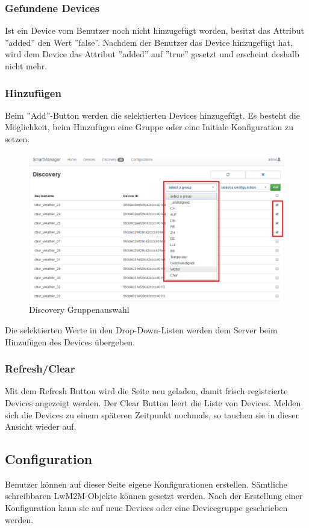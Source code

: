 \subsubsection{Gefundene Devices}
Ist ein Device vom Benutzer noch nicht hinzugefügt worden, besitzt das Attribut ''added'' den Wert ''false''. Nachdem der Benutzer das Device hinzugefügt hat, wird dem Device das Attribut ''added'' auf ''true'' gesetzt und erscheint deshalb nicht mehr.

\subsubsection{Hinzufügen}
Beim ''Add''-Button werden die selektierten Devices hinzugefügt. Es besteht die Möglichkeit, beim Hinzufügen eine Gruppe oder eine Initiale Konfiguration zu setzen.

\begin{figure}[H]
\centering
\includegraphics[scale=0.57]{../04_Realisierung/images/userinterface/discovery_addgroup.png}
\caption{Discovery Gruppenauswahl}
\end{figure}

Die selektierten Werte in den Drop-Down-Listen werden dem Server beim Hinzufügen des Devices übergeben.

\subsubsection{Refresh/Clear}
Mit dem Refresh Button wird die Seite neu geladen, damit frisch registrierte Devices angezeigt werden. Der Clear Button leert die Liste von Devices. Melden sich die Devices zu einem späteren Zeitpunkt nochmals, so tauchen sie in dieser Ansicht wieder auf.
 \newpage

\subsection{Configuration}
Benutzer können auf dieser Seite eigene Konfigurationen erstellen. Sämtliche schreibbaren LwM2M-Objekte können gesetzt werden. Nach der Erstellung einer Konfiguration kann sie auf neue Devices oder eine Devicegruppe geschrieben werden.

